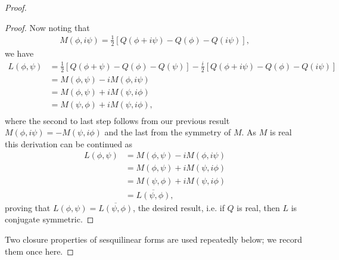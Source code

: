 \begin{proof}
\begin{proof}
Now noting that
\begin{align}
    M(\phi, i\psi) = \frac{1}{2} \left[ Q(\phi + i\psi) - Q(\phi) - Q(i\psi) \right],
\end{align}
we have
\begin{align}
    L(\phi, \psi)
        &= \frac{1}{2} \left[ Q(\phi + \psi) - Q(\phi) - Q(\psi) \right] -\frac{i}{2} \left[ Q(\phi + i\psi) - Q(\phi) - Q(i\psi) \right] \\
        &= M(\phi, \psi) - iM(\phi, i\psi) \\
        &= M(\phi, \psi) + iM(\psi, i\phi) \\
        &= M(\psi, \phi) + iM(\psi, i\phi), \\
\end{align}
where the second to last step follows from our previous result $M(\phi, i\psi) = -M(\psi, i\phi)$ and the last from the symmetry of $M$. As $M$ is real this derivation can be continued as
\begin{align}
    L(\phi, \psi)
        &= M(\phi, \psi) - iM(\phi, i\psi) \\
        &= M(\phi, \psi) + iM(\psi, i\phi) \\
        &= M(\psi, \phi) + iM(\psi, i\phi) \\
        &= \overline{L(\psi, \phi)},
\end{align}
proving that $L(\phi, \psi) = \overline{L(\psi, \phi)}$, the desired result, i.e. if $Q$ is real, then $L$ is conjugate symmetric.
\end{proof}

Two closure properties of sesquilinear forms are used repeatedly below; we record them once here.


\end{proof}
